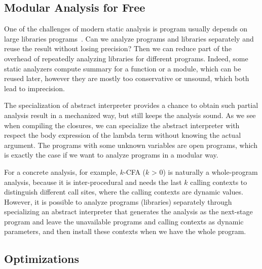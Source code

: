\subsection{Modular Analysis for Free}

One of the challenges of modern static analysis is program usually depends on
large libraries programs~\cite{toman_et_al:LIPIcs:2017:7121}. Can we analyze
programs and libraries separately and reuse the result without losing precision?
Then we can reduce part of the overhead of repeatedly analyzing libraries for
different programs. Indeed, some static analyzers compute summary for a function
or a module, which can be reused later, however they are mostly too conservative
or unsound, which both lead to imprecision.

The specialization of abstract interpreter provides a chance to obtain such
partial analysis result in a mechanized way, but still keeps the analysis sound.
As we see when compiling the closures, we can specialize the abstract
interpreter with respect the body expression of the lambda term without knowing
the actual argument. The programs with some unknown variables are open programs,
which is exactly the case if we want to analyze programs in a modular way.

For a concrete analysis, for example, $k$-CFA ($k$ > 0) is naturally a
whole-program analysis, because it is inter-procedural and needs the last $k$
calling contexts to distinguish different call sites, where the calling contexts
are dynamic values. However, it is possible to analyze programs (libraries)
separately through specializing an abstract interpreter that generates the
analysis as the next-stage program and leave the unavailable programs and
calling contexts as dynamic parameters, and then install these contexts when we
have the whole program.

\iffalse
Another perspective: programs are data for an abstract interpreter, so if we
have $n$ programs, then maybe there can be $n$ stages. Probably we can analyze
first $m$ programs, and generate a residual abstract interpreter waiting for the
rest $(n-m)$ programs. These $(n-m)$ programs might be (abstract) arguments for
the first $n$ programs, and the abstract interpreter itself might be a partial
abstract interpreter.
\fi

\subsection{Optimizations} \label{staged_ds}

